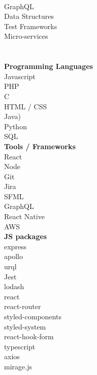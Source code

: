 \documentclass[8pt]{developercv}
\newcommand{\CC}{C\nolinebreak\hspace{-.05em}\raisebox{.4ex}{\tiny\bf +}\nolinebreak\hspace{-.10em}\raisebox{.4ex}{\tiny\bf +}}
\def\CC{{C\nolinebreak[4]\hspace{-.05em}\raisebox{.4ex}{\tiny\bf ++}}}
\begin{document}
\begin{minipage}[t]{0.05\textwidth}
\hphantom{0.1}
\end{minipage}
	\begin{minipage}[t]{0.3\textwidth}		%
		\\
		{GraphQL}\\
		{Data Structures}\\
		{Test Frameworks}\\
		{Micro-services}\\
		
		\\
		\\\textbf{Programming Languages}\\
		{Javascript}\\
		{PHP}\\
		{\CC}\\
		{HTML / CSS}\\
		{Java)}\\
		{Python}\\
		{SQL}\\

		\textbf{Tools / Frameworks}\\
		{React}\\
		{Node}\\
		{Git}\\
		{Jira}\\
		{SFML}\\
		{GraphQL}\\
		{React Native}\\
		{AWS}\\
		
		\textbf{JS packages}\\
		{express}\\
		{apollo}\\
		{urql}\\
		{Jest}\\
		{lodash}\\
		{react}\\
		{react-router}\\
		{styled-components}\\
		{styled-system}\\
		{react-hook-form}\\
		{typescript}\\
		{axios}\\
		{mirage.js}\\

	\end{minipage}
\end{document}
